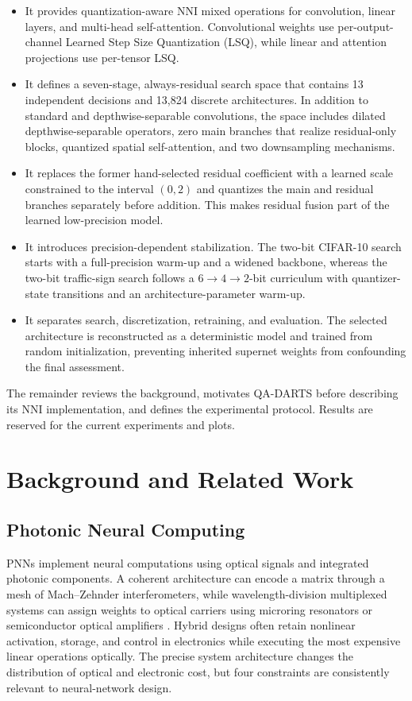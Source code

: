 \documentclass[lettersize,journal]{IEEEtran}
\begin{document}
\begin{itemize}
\item It provides quantization-aware NNI mixed operations for convolution, linear layers, and multi-head self-attention. Convolutional weights use per-output-channel Learned Step Size Quantization (LSQ), while linear and attention projections use per-tensor LSQ.
\item It defines a seven-stage, always-residual search space that contains 13 independent decisions and 13,824 discrete architectures. In addition to standard and depthwise-separable convolutions, the space includes dilated depthwise-separable operators, zero main branches that realize residual-only blocks, quantized spatial self-attention, and two downsampling mechanisms.
\item It replaces the former hand-selected residual coefficient with a learned scale constrained to the interval $(0,2)$ and quantizes the main and residual branches separately before addition. This makes residual fusion part of the learned low-precision model.
\item It introduces precision-dependent stabilization. The two-bit CIFAR-10 search starts with a full-precision warm-up and a widened backbone, whereas the two-bit traffic-sign search follows a $6\rightarrow4\rightarrow2$-bit curriculum with quantizer-state transitions and an architecture-parameter warm-up.
\item It separates search, discretization, retraining, and evaluation. The selected architecture is reconstructed as a deterministic model and trained from random initialization, preventing inherited supernet weights from confounding the final assessment.
\end{itemize}

The remainder reviews the background, motivates QA-DARTS before describing its NNI implementation, and defines the experimental protocol. Results are reserved for the current experiments and plots.

\section{Background and Related Work}
\subsection{Photonic Neural Computing}
PNNs implement neural computations using optical signals and integrated photonic components. A coherent architecture can encode a matrix through a mesh of Mach--Zehnder interferometers, while wavelength-division multiplexed systems can assign weights to optical carriers using microring resonators or semiconductor optical amplifiers \cite{demarinis2019survey}. Hybrid designs often retain nonlinear activation, storage, and control in electronics while executing the most expensive linear operations optically. The precise system architecture changes the distribution of optical and electronic cost, but four constraints are consistently relevant to neural-network design.
\end{document}
